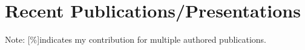 \documentclass[]{deedy-resume-openfont}
\begin{document}
\begin{minipage}[t]{0.66\textwidth}
\section{Recent Publications/Presentations}
\renewcommand\refname{\vskip -1.5cm} %

\footnotesize
\setlength{\itemsep}{0pt}

\nocite{*}
{\footnotesize Note: [\%]indicates my contribution for multiple authored publications.}	
\end{minipage} 
\end{document}
